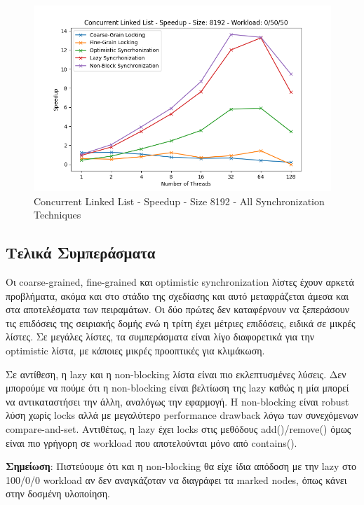 \documentclass[../final_report.tex]{subfiles}
\begin{document}
\begin{figure}[H]
        \includegraphics[scale=0.4]{outFiles/plots/concurrent_data_structs_all_speedup_8192_0_50_50.png}
    \caption{Concurrent Linked List - Speedup - Size 8192 - All Synchronization Techniques}
    \label{fig:Concurrent Linked List - Speedup - Size 8192 - All Synchronization Techniques}
\end{figure}

\subsection*{Τελικά Συμπεράσματα}
Οι coarse-grained, fine-grained και optimistic synchronization λίστες έχουν αρκετά προβλήματα, ακόμα και στο στάδιο της σχεδίασης και αυτό
μεταφράζεται άμεσα και στα αποτελέσματα των πειραμάτων. Οι δύο πρώτες δεν καταφέρνουν να ξεπεράσουν τις επιδόσεις της σειριακής δομής ενώ η τρίτη
έχει μέτριες επιδόσεις, ειδικά σε μικρές λίστες. Σε μεγάλες λίστες, τα συμπεράσματα είναι λίγο διαφορετικά για την optimistic λίστα, με
κάποιες μικρές προοπτικές για κλιμάκωση.

Σε αντίθεση, η lazy και η non-blocking λίστα είναι πιο εκλεπτυσμένες λύσεις.
Δεν μπορούμε να πούμε ότι η non-blocking είναι βελτίωση της lazy καθώς η μία μπορεί να αντικαταστήσει την άλλη, αναλόγως την εφαρμογή.
Η non-blocking είναι robust λύση χωρίς locks αλλά με μεγαλύτερο performance drawback λόγω των συνεχόμενων compare-and-set. Αντιθέτως, η
lazy έχει locks στις μεθόδους add()/remove() όμως είναι πιο γρήγορη σε workload που αποτελούνται μόνο από contains().

\textbf{Σημείωση}: Πιστεύουμε ότι και η non-blocking θα είχε ίδια απόδοση με την lazy στο 100/0/0 workload αν δεν αναγκάζοταν να διαγράφει
τα marked nodes, όπως κάνει στην δοσμένη υλοποίηση.
\end{document}
